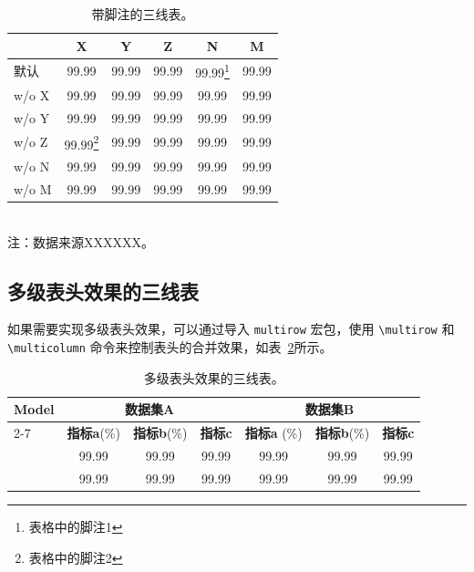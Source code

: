 \begin{table}[htb]
    \centering
    \begin{minipage}[t]{0.55\linewidth} %
        \caption{带脚注的三线表。}
        \label{tab:example-table-footnote}
        \begin{small}
        \begin{tabular}{@{}lccccc@{}}
            \toprule[1.5pt]
            & \textbf{X} & \textbf{Y} & \textbf{Z} & \textbf{N} & \textbf{M} \\
            \midrule[1pt]
                默认        & 99.99 & 99.99 & 99.99 & 99.99\footnote{表格中的脚注1} & 99.99 \\
            \quad w/o X   & 99.99 & 99.99 & 99.99 & 99.99 & 99.99 \\
            \quad w/o Y   & 99.99 & 99.99 & 99.99 & 99.99 & 99.99 \\
            \quad w/o Z   & 99.99\footnote{表格中的脚注2} & 99.99 & 99.99 & 99.99 & 99.99 \\
            \quad w/o N   & 99.99 & 99.99 & 99.99 & 99.99 & 99.99 \\
            \quad w/o M   & 99.99 & 99.99 & 99.99 & 99.99 & 99.99 \\
            \bottomrule[1.5pt]
        \end{tabular}
        \end{small}
        \\[6pt] \footnotesize 注：数据来源XXXXXX。\\
    \end{minipage}
\end{table}

\subsection{多级表头效果的三线表}
如果需要实现多级表头效果，可以通过导入 \verb|multirow| 宏包，使用 \verb|\multirow| 和 \verb|\multicolumn| 命令来控制表头的合并效果，如表~\ref{tab:example-table-multi}所示。
\begin{table}[htbp]
    \centering
    \caption{多级表头效果的三线表。}
    \label{tab:example-table-multi}
    \begin{small}
    \begin{tabular}{@{}l|ccc|ccc@{}}
    \toprule
    \multirow{2}{*}{\textbf{Model}} & \multicolumn{3}{c|}{\textbf{数据集A}} & \multicolumn{3}{c}{\textbf{数据集B}} \\ \cmidrule(l){2-7} 
    & \textbf{指标a}(\%) & \textbf{指标b}(\%) & \textbf{指标c} & \textbf{指标a} (\%) & \textbf{指标b}(\%) & \textbf{指标c} \\ \midrule
        \citet{devlin2018bert}      &99.99  & 99.99  & 99.99  &99.99  & 99.99  & 99.99  \\
        \citet{yang2019xlnet}      &99.99  & 99.99  & 99.99  &99.99  & 99.99  & 99.99  \\
    \bottomrule
    \end{tabular}
    \end{small}
\end{table}

